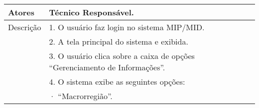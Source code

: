\begin{table}[H]
\begin{tabular}{|l|l|}
Atores                                                   & Técnico Responsável.                                                                                                                                                                                                                                                                                                                                                                     \\ \hline
Descrição                                                & 1. O usuário faz login no sistema MIP/MID.                                                                                                                                                                                                                                                                                                                                               \\ \hline
                                                         & 2. A tela principal do sistema e exibida.                                                                                                                                                                                                                                                                                                                                                \\ \hline
                                                         & 3. O usuário clica sobre a caixa de opções “Gerenciamento de Informações”.                                                                                                                                                                                                                                                                                                               \\ \hline
                                                         & 4. O sistema exibe as seguintes opções:                                                                                                                                                                                                                                                                                                                                                  \\ \hline
                                                         & ·         “Macrorregião”.                                                                                                                                                                                                                                                                                                                                                                \\ \hline

\end{tabular}
\end{table}
